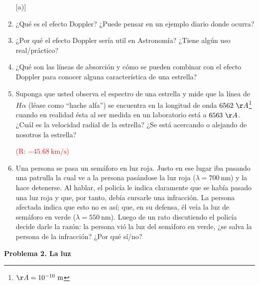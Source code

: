 \documentclass{article}
\begin{document}
\begin{enumerate} [a)]

\item ¿Qué es el efecto Doppler? ¿Puede pensar en un ejemplo diario donde ocurra?

\item ¿Por qué el efecto Doppler sería util en Astronomía? ¿Tiene algún uso real/práctico?

\item ¿Qué son las líneas de absorción y cómo se pueden combinar con el efecto Doppler para conocer alguna característica de una estrella?

\item Suponga que usted observa el espectro de una estrella y mide que la línea de $H \alpha$ (léase como ``hache alfa'') se encuentra en la longitud de onda $6562 \ \AA$\footnote{$\AA = 10^{-10} \ \text{m}$} cuando en realidad ésta al ser medida en un laboratorio está a $6563 \ \AA$. ¿Cuál es la velocidad radial de la estrella? ¿Se está acercando o alejando de nosotros la estrella? 

\textcolor{red}{(R: $-45.68 \ \text{km} / \text{s}$)}

\item Una persona se pasa un semáforo en luz roja. Justo en ese lugar iba pasando una patrulla la cual ve a la persona pasándose la luz roja ($\lambda = 700 \ \text{nm}$) y la hace detenerse. Al hablar, el policía le indica claramente que se había pasado una luz roja y que, por tanto, debía cursarle una infracción. La persona afectada indica que esto no es así; que, en su defensa, él veía la luz de semáforo en verde ($\lambda = 550 \ \text{nm}$). Luego de un rato discutiendo el policía decide darle la razón: la persona vió la luz del semáforo en verde, ¿se salva la persona de la infracción? ¿Por qué sí/no?
\end{enumerate}

\textbf{Problema 2. La luz}
\end{document}
